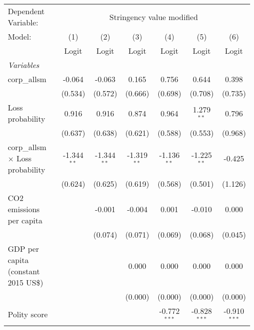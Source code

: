 
\begingroup
\centering
\begin{tabular}{lcccccc}
   \toprule
   Dependent Variable: & \multicolumn{6}{c}{Stringency value modified}\\
   Model:                                  & (1)           & (2)           & (3)           & (4)            & (5)            & (6)\\  
                                           &  Logit        & Logit         & Logit         & Logit          & Logit          & Logit\\  
   \midrule
   \emph{Variables}\\
   corp\_allsm                             & -0.064        & -0.063        & 0.165         & 0.756          & 0.644          & 0.398\\   
                                           & (0.534)       & (0.572)       & (0.666)       & (0.698)        & (0.708)        & (0.735)\\   
   Loss probability                        & 0.916         & 0.916         & 0.874         & 0.964          & 1.279$^{**}$   & 0.796\\   
                                           & (0.637)       & (0.638)       & (0.621)       & (0.588)        & (0.553)        & (0.968)\\   
   corp\_allsm $\times$ Loss probability   & -1.344$^{**}$ & -1.344$^{**}$ & -1.319$^{**}$ & -1.136$^{**}$  & -1.225$^{**}$  & -0.425\\   
                                           & (0.624)       & (0.625)       & (0.619)       & (0.568)        & (0.501)        & (1.126)\\   
   CO2 emissions per capita                &               & -0.001        & -0.004        & 0.001          & -0.010         & 0.000\\   
                                           &               & (0.074)       & (0.071)       & (0.069)        & (0.068)        & (0.045)\\   
   GDP per capita (constant 2015 US\$)     &               &               & 0.000         & 0.000          & 0.000          & 0.000\\   
                                           &               &               & (0.000)       & (0.000)        & (0.000)        & (0.000)\\   
   Polity score                            &               &               &               & -0.772$^{***}$ & -0.828$^{***}$ & -0.910$^{***}$\\   

\end{tabular}
